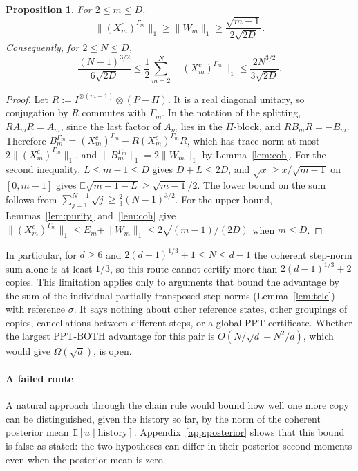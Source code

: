 \documentclass[pdflatex,sn-mathphys-num]{sn-jnl}%
\theoremstyle{thmstyleone}
\newtheorem{proposition}[theorem]{Proposition}
\theoremstyle{thmstylethree}
\theoremstyle{thmstyletwo}
\newcommand{\E}{\mathbb{E}}
\begin{document}
\begin{proposition}\label{prop:limit}
For $2\le m\le D$,
\[
\|(X^c_m)^{\Gamma_m}\|_1\ge\|W_m\|_1\ge\frac{\sqrt{m-1}}{2\sqrt{2D}} .
\]
Consequently, for $2\le N\le D$,
\[
\frac{(N-1)^{3/2}}{6\sqrt{2D}}\le\frac12\sum_{m=2}^N\|(X^c_m)^{\Gamma_m}\|_1\le\frac{2N^{3/2}}{3\sqrt{2D}} .
\]
\end{proposition}
\begin{proof}
Let $R:=I^{\otimes(m-1)}\otimes(P-\Pi)$. It is a real diagonal unitary, so conjugation by $R$ commutes with $\Gamma_m$.
In the notation of the splitting, $RA_mR=A_m$, since the last factor of $A_m$ lies in the $\Pi$-block, and
$RB_mR=-B_m$. Therefore $B_m^{\Gamma_m}=(X^c_m)^{\Gamma_m}-R(X^c_m)^{\Gamma_m}R$, which has trace norm at most
$2\|(X^c_m)^{\Gamma_m}\|_1$, and $\|B_m^{\Gamma_m}\|_1=2\|W_m\|_1$ by Lemma~\ref{lem:coh}. For the second inequality,
$L\le m-1\le D$ gives $D+L\le2D$, and $\sqrt x\ge x/\sqrt{m-1}$ on $[0,m-1]$ gives $\E\sqrt{m-1-L}\ge\sqrt{m-1}/2$. The
lower bound on the sum follows from $\sum_{j=1}^{N-1}\sqrt j\ge\frac23(N-1)^{3/2}$. For the upper bound,
Lemmas~\ref{lem:purity} and~\ref{lem:coh} give $\|(X^c_m)^{\Gamma_m}\|_1\le E_m+\|W_m\|_1\le2\sqrt{(m-1)/(2D)}$ when
$m\le D$.
\end{proof}

In particular, for $d\ge6$ and $2(d-1)^{1/3}+1\le N\le d-1$ the coherent step-norm sum alone is at least $1/3$, so this
route cannot certify more than $2(d-1)^{1/3}+2$ copies. This limitation applies only to arguments that bound the
advantage by the sum of the individual partially transposed step norms (Lemma~\ref{lem:tele}) with reference $\sigma$.
It says nothing about other reference states, other groupings of copies, cancellations between different steps, or a
global PPT certificate. Whether the largest PPT-BOTH advantage for this pair is $O(N/\sqrt d+N^2/d)$, which would give
$\Omega(\sqrt d)$, is open.

\paragraph{A failed route} A natural approach through the chain rule would bound how well one more copy can be
distinguished, given the history so far, by the norm of the coherent posterior mean $\E[u\mid\text{history}]$.
Appendix~\ref{app:posterior} shows that this bound is false as stated: the two hypotheses can differ in their posterior
second moments even when the posterior mean is zero.
\end{document}
